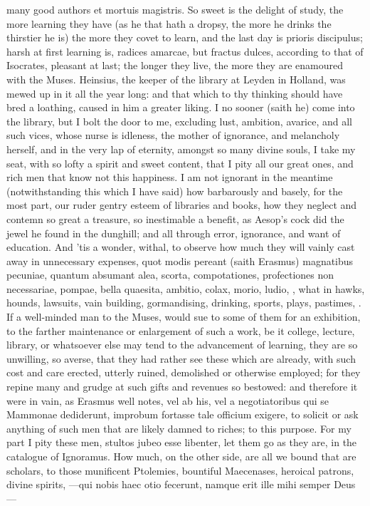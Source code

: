 {many good authors et mortuis magistris. So sweet is the delight of
study, the more learning they have (as he that hath a dropsy, the more
he drinks the thirstier he is) the more they covet to learn, and the
last day is prioris discipulus; harsh at first learning is, radices
amarcae, but fractus dulces, according to that of Isocrates, pleasant
at last; the longer they live, the more they are enamoured with the
Muses. Heinsius, the keeper of the library at Leyden in Holland, was
mewed up in it all the year long: and that which to thy thinking should
have bred a loathing, caused in him a greater liking. I no sooner
(saith he) come into the library, but I bolt the door to me, excluding
lust, ambition, avarice, and all such vices, whose nurse is idleness,
the mother of ignorance, and melancholy herself, and in the very lap of
eternity, amongst so many divine souls, I take my seat, with so lofty a
spirit and sweet content, that I pity all our great ones, and rich men
that know not this happiness. I am not ignorant in the meantime
(notwithstanding this which I have said) how barbarously and basely,
for the most part, our ruder gentry esteem of libraries and books, how
they neglect and contemn so great a treasure, so inestimable a benefit,
as Aesop's cock did the jewel he found in the dunghill; and all through
error, ignorance, and want of education. And 'tis a wonder, withal, to
observe how much they will vainly cast away in unnecessary expenses,
quot modis pereant (saith Erasmus) magnatibus pecuniae, quantum
absumant alea, scorta, compotationes, profectiones non necessariae,
pompae, bella quaesita, ambitio, colax, morio, ludio, \etc{}, what in
hawks, hounds, lawsuits, vain building, gormandising, drinking, sports,
plays, pastimes, \etc{}. If a well-minded man to the Muses, would sue to
some of them for an exhibition, to the farther maintenance or
enlargement of such a work, be it college, lecture, library, or
whatsoever else may tend to the advancement of learning, they are so
unwilling, so averse, that they had rather see these which are already,
with such cost and care erected, utterly ruined, demolished or
otherwise employed; for they repine many and grudge at such gifts and
revenues so bestowed: and therefore it were in vain, as Erasmus well
notes, vel ab his, vel a negotiatoribus qui se Mammonae dediderunt,
improbum fortasse tale officium exigere, to solicit or ask anything of
such men that are likely damned to riches; to this purpose. For my part
I pity these men, stultos jubeo esse libenter, let them go as they are,
in the catalogue of Ignoramus. How much, on the other side, are all we
bound that are scholars, to those munificent Ptolemies, bountiful
Maecenases, heroical patrons, divine spirits,
---qui nobis haec otio fecerunt, namque erit ille mihi semper
Deus---

}

